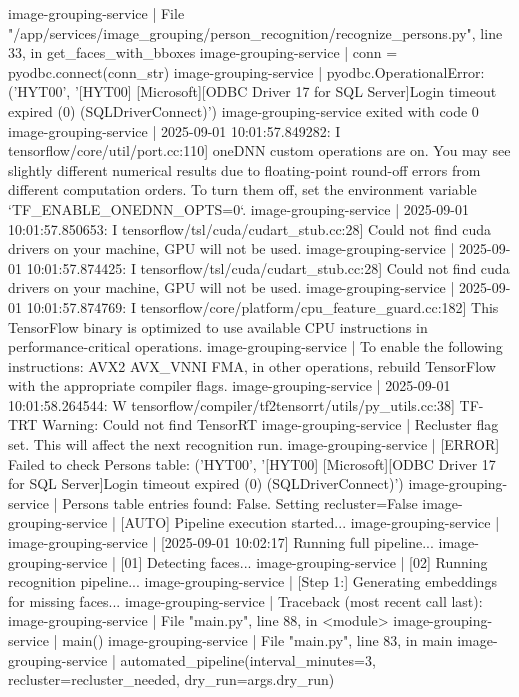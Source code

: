 image-grouping-service  |   File "/app/services/image_grouping/person_recognition/recognize_persons.py", line 33, in get_faces_with_bboxes
image-grouping-service  |     conn = pyodbc.connect(conn_str)
image-grouping-service  | pyodbc.OperationalError: ('HYT00', '[HYT00] [Microsoft][ODBC Driver 17 for SQL Server]Login timeout expired (0) (SQLDriverConnect)')
image-grouping-service exited with code 0
image-grouping-service  | 2025-09-01 10:01:57.849282: I tensorflow/core/util/port.cc:110] oneDNN custom operations are on. You may see slightly different numerical results due to floating-point round-off errors from different computation orders. To turn them off, set the environment variable `TF_ENABLE_ONEDNN_OPTS=0`.
image-grouping-service  | 2025-09-01 10:01:57.850653: I tensorflow/tsl/cuda/cudart_stub.cc:28] Could not find cuda drivers on your machine, GPU will not be used.
image-grouping-service  | 2025-09-01 10:01:57.874425: I tensorflow/tsl/cuda/cudart_stub.cc:28] Could not find cuda drivers on your machine, GPU will not be used.
image-grouping-service  | 2025-09-01 10:01:57.874769: I tensorflow/core/platform/cpu_feature_guard.cc:182] This TensorFlow binary is optimized to use available CPU instructions in performance-critical operations.
image-grouping-service  | To enable the following instructions: AVX2 AVX_VNNI FMA, in other operations, rebuild TensorFlow with the appropriate compiler flags.
image-grouping-service  | 2025-09-01 10:01:58.264544: W tensorflow/compiler/tf2tensorrt/utils/py_utils.cc:38] TF-TRT Warning: Could not find TensorRT
image-grouping-service  | Recluster flag set. This will affect the next recognition run.
image-grouping-service  | [ERROR] Failed to check Persons table: ('HYT00', '[HYT00] [Microsoft][ODBC Driver 17 for SQL Server]Login timeout expired (0) (SQLDriverConnect)')
image-grouping-service  | Persons table entries found: False. Setting recluster=False
image-grouping-service  | [AUTO] Pipeline execution started...
image-grouping-service  |
image-grouping-service  | [2025-09-01 10:02:17] Running full pipeline...
image-grouping-service  | [01] Detecting faces...
image-grouping-service  | [02] Running recognition pipeline...
image-grouping-service  | [Step 1:] Generating embeddings for missing faces...
image-grouping-service  | Traceback (most recent call last):
image-grouping-service  |   File "main.py", line 88, in <module>
image-grouping-service  |     main()
image-grouping-service  |   File "main.py", line 83, in main
image-grouping-service  |     automated_pipeline(interval_minutes=3, recluster=recluster_needed, dry_run=args.dry_run)
